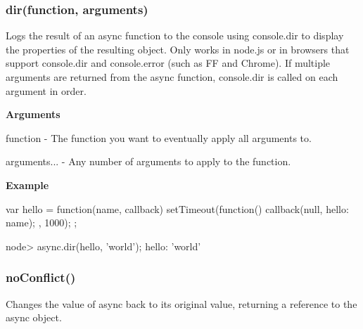 \label{_dir}%
 \subsubsection*{dir(function, arguments)}

Logs the result of an async function to the console using console.\+dir to display the properties of the resulting object. Only works in node.\+js or in browsers that support console.\+dir and console.\+error (such as FF and Chrome). If multiple arguments are returned from the async function, console.\+dir is called on each argument in order.

{\bfseries Arguments}


\begin{DoxyItemize}
\item function -\/ The function you want to eventually apply all arguments to.
\item arguments... -\/ Any number of arguments to apply to the function.
\end{DoxyItemize}

{\bfseries Example} \begin{DoxyVerb}var hello = function(name, callback){
    setTimeout(function(){
        callback(null, {hello: name});
    }, 1000);
};

node> async.dir(hello, 'world');
{hello: 'world'}
\end{DoxyVerb}






\label{_noConflict}%
 \subsubsection*{no\+Conflict()}

Changes the value of async back to its original value, returning a reference to the async object. 